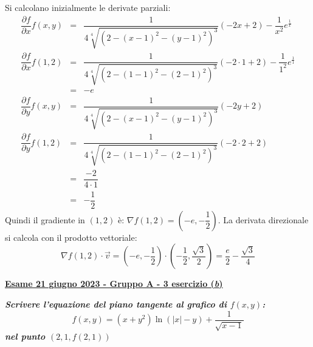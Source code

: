 \documentclass[a4paper]{article}
\newcommand{\definition}[1]{\textcolor{Red3}{\textbf{#1}}}
\newcommand{\example}[1]{\textcolor{Green4}{\textbf{#1}}}
\begin{document}
	\noindent
	Si calcolano inizialmente le derivate parziali:
	\begin{equation*}
		\begin{array}{rcl}
			\dfrac{\partial f}{\partial x} f\left(x,y\right) &=& \dfrac{1}{4\sqrt[4]{\left(2-\left(x-1\right)^{2}-\left(y-1\right)^{2}\right)^{3}}} \left(-2x+2\right) -\dfrac{1}{x^{2}} e^{\frac{1}{x}} \\ [2.5em]
			\dfrac{\partial f}{\partial x} f\left(1,2\right) &=& \dfrac{1}{4\sqrt[4]{\left(2-\left(1-1\right)^{2}-\left(2-1\right)^{2}\right)^{3}}} \left(-2\cdot 1+2\right) -\dfrac{1}{1^{2}} e^{\frac{1}{1}} \\ [2.5em]
			&=& -e \\ [1.5em]
			\dfrac{\partial f}{\partial y} f\left(x,y\right) &=& \dfrac{1}{4\sqrt[4]{\left(2-\left(x-1\right)^{2}-\left(y-1\right)^{2}\right)^{3}}} \left(-2y+2\right) \\ [2.5em]
			\dfrac{\partial f}{\partial y} f\left(1,2\right) &=& \dfrac{1}{4\sqrt[4]{\left(2-\left(1-1\right)^{2}-\left(2-1\right)^{2}\right)^{3}}} \left(-2\cdot 2+2\right) \\ [2.5em]
			&=& \dfrac{-2}{4 \cdot 1} \\ [1em]
			&=& -\dfrac{1}{2}
		\end{array}
	\end{equation*}
	Quindi il gradiente in $\left(1,2\right)$ è: $\nabla f\left(1,2\right) = \left(-e, -\dfrac{1}{2}\right)$. La derivata direzionale si calcola con il prodotto vettoriale:
	\begin{equation*}
		\nabla f\left(1,2\right) \cdot \overrightarrow{v} = \left(-e, -\dfrac{1}{2}\right) \cdot \left(-\frac{1}{2}, \frac{\sqrt{3}}{2}\right) = \dfrac{e}{2} - \dfrac{\sqrt{3}}{4}
	\end{equation*}\newpage

	\begin{flushleft}
		\label{exam: esame 21 giugno 2023 - Gruppo A - 3 esercizio (b)}
		\hypertarget{
			exam: esame 21 giugno 2023 - Gruppo A - 3 esercizio (b)
		}{
			\definition{\underline{Esame 21 giugno 2023 - Gruppo A - 3 esercizio (\emph{b})}}
		}
	\end{flushleft}
	\example{\emph{Scrivere l'equazione del piano tangente al grafico di $f\left(x,y\right)$:}
	\begin{equation*}
		f\left(x,y\right) = \left(x+y^{2}\right)\ln\left(\left|x\right|-y\right) + \dfrac{1}{\sqrt{x-1}}
	\end{equation*}
	\emph{nel punto $\left(2,1,f\left(2,1\right)\right)$}}\newline
\end{document}
